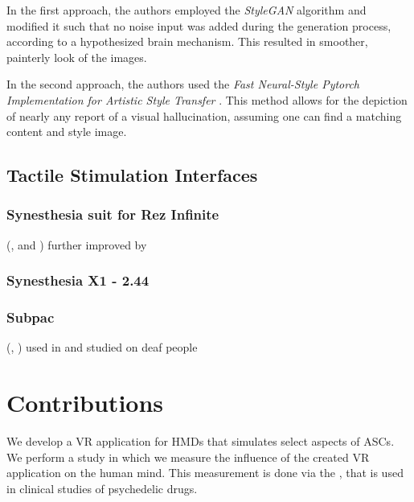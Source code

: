 In the first approach, the authors employed the \textit{StyleGAN} algorithm \autocite{karras2019cvpr} and modified it such that no noise input was added during the generation process, according to a hypothesized brain mechanism. This resulted in smoother, painterly look of the images.

In the second approach, the authors used the \textit{Fast Neural-Style Pytorch Implementation for Artistic Style Transfer} \autocite{johnson2016perceptual}. This method allows for the depiction of nearly any report of a visual hallucination, assuming one can find a matching content and style image.

\subsection{Tactile Stimulation Interfaces}\label{sec:tactile_stimulation_interfaces}

\subsubsection{Synesthesia suit for Rez Infinite}\label{sec:synesthesia_suit}
(\textcite{konishi2016synesthesia1}, \textcite{konishi2016synesthesia2} and \textcite{synesthesia2016suit})
further improved by \autocite{furukawa2019synesthesia}
\textcite{outram2017crystal}

\subsubsection{Synesthesia X1 - 2.44}
\autocite{synesthesia2021x1}

\subsubsection{Subpac}
(\textcite{subpac2013subpac}, \textcite{drempetic2017wearable})
used in \autocite{zimmermann2016longing}
and studied on deaf people \autocite{schmitz2020hearing}


\section{Contributions}
We develop a \ac{VR} application for \acp{HMD} that simulates select aspects of \acp{ASC}.
We perform a study in which we measure the influence of the created \ac{VR} application on the human mind. This measurement is done via the , that is used in clinical studies of psychedelic drugs.
